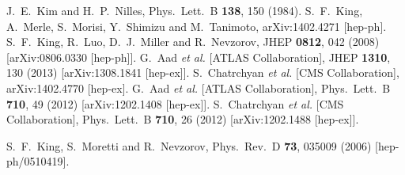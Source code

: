 \documentclass[final,3p,11pt,pdflatex]{elsarticle}
\begin{document}
\begin{thebibliography}{100}
  J.~E.~Kim and H.~P.~Nilles,
  Phys.\ Lett.\ B {\bf 138}, 150 (1984).
  S.~F.~King, A.~Merle, S.~Morisi, Y.~Shimizu and M.~Tanimoto,
  arXiv:1402.4271 [hep-ph].
  S.~F.~King, R.~Luo, D.~J.~Miller and R.~Nevzorov,
  JHEP {\bf 0812}, 042 (2008)
  [arXiv:0806.0330 [hep-ph]].
  G.~Aad {\it et al.}  [ATLAS Collaboration],
  JHEP {\bf 1310}, 130 (2013)
  [arXiv:1308.1841 [hep-ex]].
  S.~Chatrchyan {\it et al.}  [CMS Collaboration],
  arXiv:1402.4770 [hep-ex].
  G.~Aad {\it et al.}  [ATLAS Collaboration],
  Phys.\ Lett.\ B {\bf 710}, 49 (2012)
  [arXiv:1202.1408 [hep-ex]].
  S.~Chatrchyan {\it et al.}  [CMS Collaboration],
  Phys.\ Lett.\ B {\bf 710}, 26 (2012)
  [arXiv:1202.1488 [hep-ex]].

  S.~F.~King, S.~Moretti and R.~Nevzorov,
  Phys.\ Rev.\ D {\bf 73}, 035009 (2006)
  [hep-ph/0510419].


\end{thebibliography}
\end{document}

